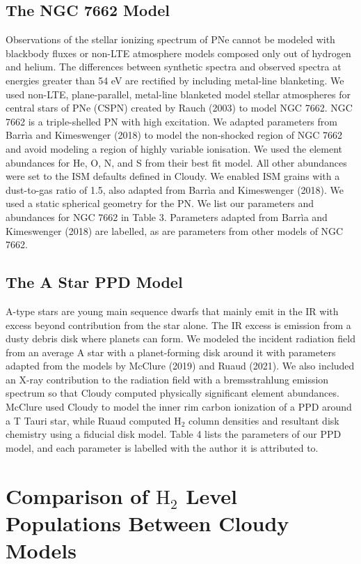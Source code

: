 \documentclass[12pt, letterpaper]{book}
\begin{document}
\subsection{The NGC 7662 Model}
Observations of the stellar ionizing spectrum of PNe cannot be modeled with blackbody fluxes or non-LTE atmosphere models composed only out of hydrogen and helium. The differences between synthetic spectra and observed spectra at energies greater than 54 eV are rectified by including metal-line blanketing. We used non-LTE, plane-parallel, metal-line blanketed model stellar atmospheres for central stars of PNe (CSPN) created by Rauch (2003) to model NGC 7662. NGC 7662 is a triple-shelled PN with high excitation. We adapted parameters from Barr\`ia and Kimeswenger (2018) to model the non-shocked region of NGC 7662 and avoid modeling a region of highly variable ionisation. We used the element abundances for He, O, N, and S from their best fit model. All other abundances were set to the ISM defaults defined in Cloudy. We enabled ISM grains with a dust-to-gas ratio of 1.5, also adapted from Barr\`ia and Kimeswenger (2018). We used a static spherical geometry for the PN. We list our parameters and abundances for NGC 7662 in Table 3. Parameters adapted from Barr\`ia and Kimeswenger (2018) are labelled, as are parameters from other models of NGC 7662.

\subsection{The A Star PPD Model}
A-type stars are young main sequence dwarfs that mainly emit in the IR with excess beyond contribution from the star alone. The IR excess is emission from a dusty debris disk where planets can form. We modeled the incident radiation field from an average A star with a planet-forming disk around it with parameters adapted from the models by McClure (2019) and Ruaud (2021). We also included an X-ray contribution to the radiation field with a bremsstrahlung emission spectrum so that Cloudy computed physically significant element abundances. McClure used Cloudy to model the inner rim carbon ionization of a PPD around a T Tauri star, while Ruaud computed $\textrm{H}_2$ column densities and resultant disk chemistry using a fiducial disk model. Table 4 lists the parameters of our PPD model, and each parameter is labelled with the author it is attributed to.

\section{Comparison of $\textrm{H}_2$ Level Populations Between Cloudy Models}
\label{sec:models_B}
\end{document}
